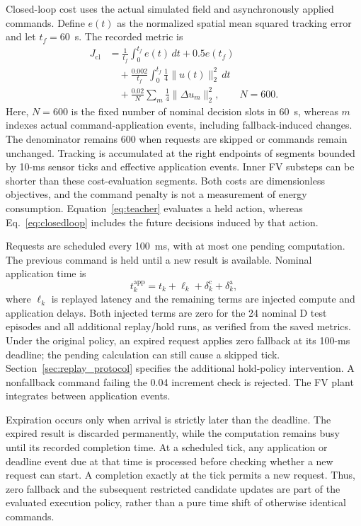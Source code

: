 Closed-loop cost uses the actual simulated field and asynchronously applied commands. Define $e(t)$ as the normalized spatial mean squared tracking error and let $t_f=60$~s. The recorded metric is
\begin{equation}
\begin{aligned}
J_{\mathrm{cl}}&=\frac{1}{t_f}\int_0^{t_f}e(t)\,dt
                       +0.5e(t_f)\\
&\quad+\frac{0.002}{t_f}\int_0^{t_f}
                       \frac{1}{4}\|u(t)\|_2^2\,dt\\
&\quad+\frac{0.02}{N}\sum_{m}
                       \frac{1}{4}\|\Delta u_m\|_2^2,
\qquad N=600.
\end{aligned}
\label{eq:closedloop}
\end{equation}
Here, $N=600$ is the fixed number of nominal decision slots in 60~s, whereas $m$ indexes actual command-application events, including fallback-induced changes. The denominator remains 600 when requests are skipped or commands remain unchanged. Tracking is accumulated at the right endpoints of segments bounded by 10-ms sensor ticks and effective application events. Inner FV substeps can be shorter than these cost-evaluation segments. Both costs are dimensionless objectives, and the command penalty is not a measurement of energy consumption. Equation~\eqref{eq:teacher} evaluates a held action, whereas Eq.~\eqref{eq:closedloop} includes the future decisions induced by that action.




Requests are scheduled every 100~ms, with at most one pending computation. The previous command is held until a new result is available. Nominal application time is
\begin{equation}
t_k^{\mathrm{app}}=t_k+\ell_k+\delta_k^{\mathrm c}+\delta_k^{\mathrm a},
\label{eq:delay}
\end{equation}
where $\ell_k$ is replayed latency and the remaining terms are injected compute and application delays. Both injected terms are zero for the 24 nominal D test episodes and all additional replay/hold runs, as verified from the saved metrics. Under the original policy, an expired request applies zero fallback at its 100-ms deadline; the pending calculation can still cause a skipped tick. Section~\ref{sec:replay_protocol} specifies the additional hold-policy intervention. A nonfallback command failing the 0.04 increment check is rejected. The FV plant integrates between application events.

Expiration occurs only when arrival is strictly later than the deadline. The expired result is discarded permanently, while the computation remains busy until its recorded completion time. At a scheduled tick, any application or deadline event due at that time is processed before checking whether a new request can start. A completion exactly at the tick permits a new request. Thus, zero fallback and the subsequent restricted candidate updates are part of the evaluated execution policy, rather than a pure time shift of otherwise identical commands.

